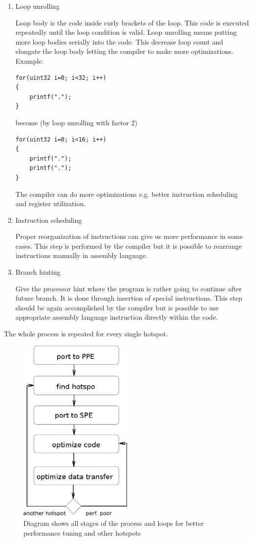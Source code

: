 \begin{enumerate}
\item{Loop unrolling}
\par
Loop body is the code inside curly brackets of the loop.
This code is executed repeatedly until the loop condition is valid.
Loop unrolling means putting more loop bodies serially into the code.
This decrease loop count and elongate the loop body letting the compiler to make more optimizations.
Example:
\begin{verbatim}
for(uint32 i=0; i<32; i++)
{
    printf(".");
}
\end{verbatim}
become (by loop unrolling with factor 2)
\begin{verbatim}
for(uint32 i=0; i<16; i++)
{
    printf(".");
    printf(".");
}
\end{verbatim}
The compiler can do more optimizations e.g. better instruction scheduling and register utilization.

\item{Instruction scheduling}
\par
Proper reorganization of instructions can give us more performance in some cases.
This step is performed by the compiler but it is possible to rearrange instructions manually in assembly language.

\item{Branch hinting}
\par
Give the processor hint where the program is rather going to continue after future branch.
It is done through insertion of special instructions.
This step should be again accomplished by the compiler but is possible to use appropriate assembly language instruction directly within the code.
\end{enumerate}

\par
The whole process is repeated for every single hotspot.

\begin{figure}
    \centering
    \includegraphics[width=0.5\textwidth]{data/portingCycle}
    \caption[Application porting cycle]{Diagram shows all stages of the process and loops for better performance tuning and other hotspots}
    \label{fg:appPorting}
\end{figure}

